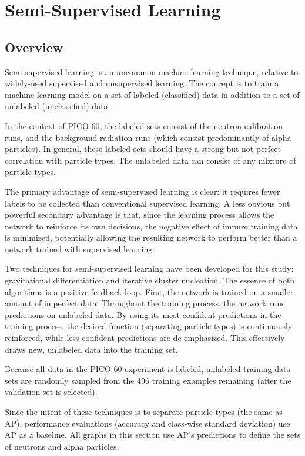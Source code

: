 \documentclass[10pt]{article}
\begin{document}
\section{Semi-Supervised Learning} \label{semi_supervised}

\subsection{Overview}

Semi-supervised learning is an uncommon machine learning technique, relative to widely-used supervised and unsupervised learning. The concept is to train a machine learning model on a set of labeled (classified) data in addition to a set of unlabeled (unclassified) data.

In the context of PICO-60, the labeled sets consist of the neutron calibration runs, and the background radiation runs (which consist predominantly of alpha particles). In general, these labeled sets should have a strong but not perfect correlation with particle types. The unlabeled data can consist of any mixture of particle types.

The primary advantage of semi-supervised learning is clear: it requires fewer labels to be collected than conventional supervised learning. A less obvious but powerful secondary advantage is that, since the learning process allows the network to reinforce its own decisions, the negative effect of impure training data is minimized, potentially allowing the resulting network to perform better than a network trained with supervised learning.

Two techniques for semi-supervised learning have been developed for this study: gravitational differentiation and iterative cluster nucleation. The essence of both algorithms is a positive feedback loop. First, the network is trained on a smaller amount of imperfect data. Throughout the training process, the network runs predictions on unlabeled data. By using its most confident predictions in the training process, the desired function (separating particle types) is continuously reinforced, while less confident predictions are de-emphasized. This effectively draws new, unlabeled data into the training set.

Because all data in the PICO-60 experiment is labeled, unlabeled training data sets are randomly sampled from the 496 training examples remaining (after the validation set is selected).

Since the intent of these techniques is to separate particle types (the same as AP), performance evaluations (accuracy and class-wise standard deviation) use AP as a baseline. All graphs in this section use AP's predictions to define the sets of neutrons and alpha particles.
\end{document}
